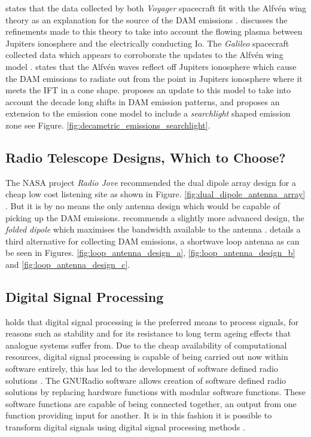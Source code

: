 \documentclass[runningheads,a4paper]{llncs}
\begin{document}
\cite{belcher87} states that the data collected by both \textit{Voyager} spacecraft fit with the Alfv\'en wing theory as an explanation for the source of the \gls{DAM} emissions \citep{belcher87}. \cite{kivelson96} discusses the refinements made to this theory to take into account the flowing plasma between Jupiters ionosphere and the electrically conducting Io. The \textit{Galileo} spacecraft collected data which appears to corroborate the updates to the Alfv\'en wing model \citep{kivelson96}. \cite{bose08} states that the Alfv\'en waves reflect off Jupiters ionosphere which cause the \gls{DAM} emissions to radiate out from the point in Jupiters ionosphere where it meets the \gls{IFT} in a cone shape. \cite{imai-08} proposes an update to this model to take into account the decade long shifts in \gls{DAM} emission patterns, and proposes an extension to the emission cone model to include a \textit{searchlight} shaped emission zone \citep{imai-08} see Figure. \ref{fig:decametric_emissions_searchlight}.

\subsection*{Radio Telescope Designs, Which to Choose?}
The NASA project \textit{Radio Jove} recommended the dual dipole array design for a cheap low cost listening site as shown in Figure. \ref{fig:dual_dipole_antenna_array} \citep{nasa12}. But it is by no means the only antenna design which would be capable of picking up the \gls{DAM} emissions. \cite{wilkinson94} recommends a slightly more advanced design, the \textit{folded dipole} which maximises the bandwidth available to the antenna \citep{wilkinson94}. \cite{greef-12} details a third alternative for collecting \gls{DAM} emissions, a shortwave loop antenna as can be seen in Figures. \ref{fig:loop_antenna_design_a}, \ref{fig:loop_antenna_design_b} and \ref{fig:loop_antenna_design_c}.

\subsection*{Digital Signal Processing}
\cite{freidt-13} holds that digital signal processing is the preferred means to process signals, for reasons such as stability and for its resistance to long term ageing effects that analogue systems suffer from. Due to the cheap availability of computational resources, digital signal processing is capable of being carried out now within software entirely, this has led to the development of software defined radio solutions \citep{freidt-13}. The GNURadio software allows creation of software defined radio solutions by replacing hardware functions with modular software functions. These software functions are capable of being connected together, an output from one function providing input for another. It is in this fashion it is possible to transform digital signals using digital signal processing methods \citep{gnuradio-14}.
\end{document}
